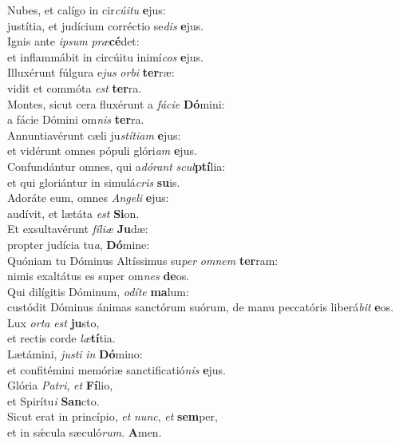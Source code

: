 \evenverse Nubes, et calígo in cir\textit{cú}\textit{i}\textit{tu} \textbf{e}jus:~\*\\
\evenverse justítia, et judícium corréctio se\textit{dis} \textbf{e}jus.\\
\oddverse Ignis ante \textit{i}\textit{psum} \textit{præ}\textbf{cé}det:~\*\\
\oddverse et inflammábit in circúitu inimí\textit{cos} \textbf{e}jus.\\
\evenverse Illuxérunt fúlgura e\textit{jus} \textit{or}\textit{bi} \textbf{ter}ræ:~\*\\
\evenverse vidit et commóta \textit{est} \textbf{ter}ra.\\
\oddverse Montes, sicut cera fluxérunt a \textit{fá}\textit{ci}\textit{e} \textbf{Dó}mini:~\*\\
\oddverse a fácie Dómini om\textit{nis} \textbf{ter}ra.\\
\evenverse Annuntiavérunt cæli ju\textit{stí}\textit{ti}\textit{am} \textbf{e}jus:~\*\\
\evenverse et vidérunt omnes pópuli glóri\textit{am} \textbf{e}jus.\\
\oddverse Confundántur omnes, qui a\textit{dó}\textit{rant} \textit{scul}\textbf{ptí}lia:~\*\\
\oddverse et qui gloriántur in simulá\textit{cris} \textbf{su}is.\\
\evenverse Adoráte eum, omnes \textit{An}\textit{ge}\textit{li} \textbf{e}jus:~\*\\
\evenverse audívit, et lætáta \textit{est} \textbf{Si}on.\\
\oddverse Et exsultavérunt \textit{fí}\textit{li}\textit{æ} \textbf{Ju}dæ:~\*\\
\oddverse propter judícia tu\textit{a}, \textbf{Dó}mine:\\
\evenverse Quóniam tu Dóminus Altíssimus su\textit{per} \textit{om}\textit{nem} \textbf{ter}ram:~\*\\
\evenverse nimis exaltátus es super om\textit{nes} \textbf{de}os.\\
\oddverse Qui dilígitis Dóminum, \textit{o}\textit{dí}\textit{te} \textbf{ma}lum:~\*\\
\oddverse custódit Dóminus ánimas sanctórum suórum, de manu peccatóris liberá\textit{bit} \textbf{e}os.\\
\evenverse Lux \textit{or}\textit{ta} \textit{est} \textbf{ju}sto,~\*\\
\evenverse et rectis corde \textit{læ}\textbf{tí}tia.\\
\oddverse Lætámini, \textit{ju}\textit{sti} \textit{in} \textbf{Dó}mino:~\*\\
\oddverse et confitémini memóriæ sanctificatió\textit{nis} \textbf{e}jus.\\
\evenverse Glória \textit{Pa}\textit{tri}, \textit{et} \textbf{Fí}lio,~\*\\
\evenverse et Spirítu\textit{i} \textbf{San}cto.\\
\oddverse Sicut erat in princípio, \textit{et} \textit{nunc}, \textit{et} \textbf{sem}per,~\*\\
\oddverse et in sǽcula sæculó\textit{rum}. \textbf{A}men.\\
